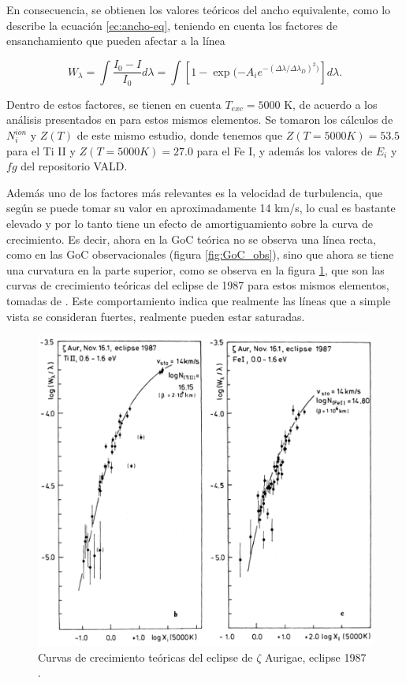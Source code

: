\documentclass[12pt,oneside,openany,letter]{book}
\begin{document}
En consecuencia, se obtienen los valores teóricos del ancho equivalente, como lo describe la ecuación \ref{ec:ancho-eq}, teniendo en cuenta los factores de ensanchamiento que pueden afectar a la línea

\begin{equation}
    W_\lambda = \int \frac{I_0 - I}{I_0}d \lambda = \int \left[1 - \exp(-A_i e^{-(\Delta\lambda/\Delta\lambda_D)^2)}\right] d\lambda.
    \label{ec:ancho-eq}
\end{equation}

Dentro de estos factores, se tienen en cuenta $T_{exc} = 5000$ K, de acuerdo a los análisis presentados en \citet{kps1O} para estos mismos elementos. Se tomaron los cálculos  de $N_i^{ion}$ y $Z(T)$ de este mismo estudio, donde tenemos que $Z(T=5000K) = 53.5$ para el Ti II y  $Z(T=5000K) = 27.0$ para el Fe I, y además los valores de $E_i$ y $fg$ del repositorio VALD. 

Además uno de los factores más relevantes es la velocidad de turbulencia, que según \citet{kps1O} se puede tomar su valor en aproximadamente 14 km/s, lo cual es bastante elevado y por lo tanto tiene un efecto de amortiguamiento sobre la curva de crecimiento. Es decir, ahora en la GoC teórica no se observa una línea recta, como en las GoC observacionales (figura \ref{fig:GoC_obs}), sino que ahora se tiene una curvatura en la parte superior, como se observa en la figura \ref{fig:cteoricas_klaus}, que son las curvas de crecimiento teóricas del eclipse de 1987 para estos mismos elementos, tomadas de \citet{kps1O}. Este comportamiento indica que realmente las líneas que a simple vista se consideran fuertes, realmente pueden estar saturadas.



\begin{figure}[h]
    \centering
    \includegraphics[width=0.8\linewidth]{Gaficas/curvas_klaus.png}
    \caption{Curvas de crecimiento teóricas del eclipse de $\zeta$ Aurigae, eclipse 1987 \citep{kps1O}.}
    \label{fig:cteoricas_klaus}
\end{figure}
\end{document}
